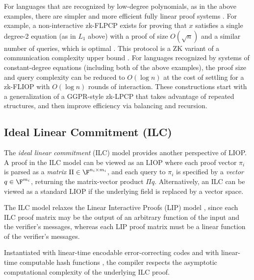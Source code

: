 For languages that are recognized by low-degree polynomials, as in the above examples, there are simpler and more efficient fully linear proof systems \cite{2019:BBCGI:crypto:ZKPs-on-secret-shared-data-via-FLPCP}. 
For example, a non-interactive zk-FLPCP exists for proving that $x$ satisfies a single degree-2 equation (as in $L_1$ above) with a proof of size $O(\sqrt{n})$ and a similar number of queries, which is optimal \cite{2002:Klauck:rectangle-size-bounds}. 
This protocol is a ZK variant of a communication complexity upper bound \cite{2009:algebrization:Aaronson}. 
For languages recognized by systems of constant-degree equations (including both of the above examples), the proof size and query complexity can be reduced to $O(\log n)$ at the cost of settling for a zk-FLIOP with $O(\log n)$ rounds of interaction. 
These constructions start with a generalization of a GGPR-style zk-LPCP that takes advantage of repeated structures, and then improve efficiency via balancing and recursion.


\subsection{Ideal Linear Commitment (ILC)}
\label{paradigms:IT:ILC}

The {\em ideal linear commitment} (ILC) model provides another perspective \cite{2017:BCGGHJ:linear-time-ZKPs-arithm-circ-sat} of LIOP. 
A proof in the ILC model can be viewed as an LIOP where each proof vector $\pi_i$ is parsed as a {\em matrix}  $\Pi\in\F^{n_i\times m_i}$, and each query to $\pi_i$ is specified by a {\em vector} $q\in\F^{m_i}$, returning the matrix-vector product $\Pi q$.
Alternatively, an ILC can be viewed as a standard LIOP if the underlying field is replaced by a vector space.

The ILC model relaxes the Linear Interactive Proofs (LIP) model \cite{2013:tcc:snargs-via-LIPs}, since each ILC proof matrix may be the output of an arbitrary function of the input and the verifier's messages, whereas each LIP proof matrix must be a linear function of the verifier's messages.




Instantiated with linear-time encodable error-correcting codes \cite{1996:Spi:linear-time-encodable-dcodable-ECC} and with linear-time computable hash functions \cite{2017:AHIKV:low-complexity-CHF}, the compiler respects the asymptotic computational complexity of the underlying ILC proof.

